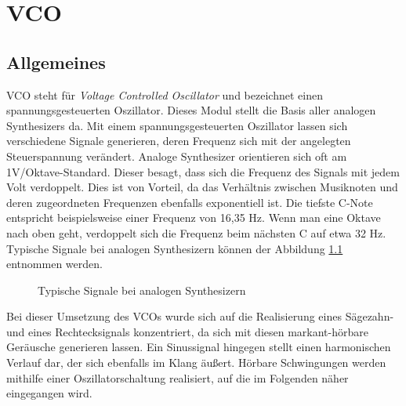 \chapter{VCO}
\label{ch:VCO}
\section{Allgemeines}

VCO steht für \textit{Voltage Controlled Oscillator} und bezeichnet einen spannungsgesteuerten Oszillator.
Dieses Modul stellt die Basis aller analogen Synthesizers da. 
Mit einem spannungsgesteuerten Oszillator lassen sich verschiedene Signale generieren, deren Frequenz sich mit der angelegten Steuerspannung verändert.
Analoge Synthesizer orientieren sich oft am 1V/Oktave-Standard.
Dieser besagt, dass sich die Frequenz des Signals mit jedem Volt verdoppelt.
Dies ist von Vorteil, da das Verhältnis zwischen Musiknoten und deren zugeordneten Frequenzen ebenfalls exponentiell ist.
Die tiefste C-Note entspricht beispielsweise einer Frequenz von 16,35 Hz.
Wenn man eine Oktave nach oben geht, verdoppelt sich die Frequenz beim nächsten C auf etwa 32 Hz. Typische Signale bei analogen Synthesizern können der Abbildung \ref{fig:Waveforms} entnommen werden. \cite{MakeSynth}

\begin{figure}[h]
	\centering
	\setlength{\fboxsep}{1pt} %
	\setlength{\fboxrule}{1pt} %
	\caption{Typische Signale bei analogen Synthesizern \cite{MakeSynth}}
	\label{fig:Waveforms}
\end{figure}

Bei dieser Umsetzung des VCOs wurde sich auf die Realisierung eines Sägezahn- und eines Rechtecksignals konzentriert, da sich mit diesen markant-hörbare Geräusche generieren lassen.
Ein Sinussignal hingegen stellt einen harmonischen Verlauf dar, der sich ebenfalls im Klang äußert.
Hörbare Schwingungen werden mithilfe einer Oszillatorschaltung realisiert, auf die im Folgenden näher eingegangen wird.

